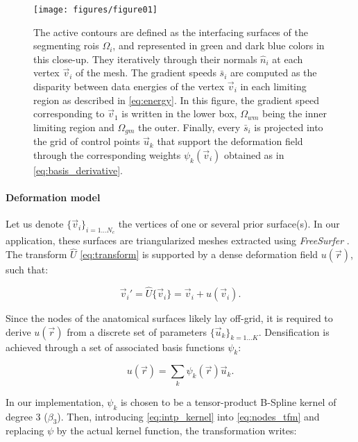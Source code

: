 \begin{figure}
	\texttt{[image: figures/figure01]}
	\caption{The active contours are defined as the interfacing surfaces of the segmenting
	\glspl{roi} $\Omega_i$, and represented in green and dark blue colors in this
	close-up.
	They iteratively through their normals $\hat{n}_i$ at each vertex $\vec{v}_i$ of the mesh.
	The gradient speeds $\bar{s}_i$ are computed as the disparity between data energies of
	the vertex $\vec{v}_i$ in each limiting region as described in \eqref{eq:energy}.
	In this figure, the gradient speed corresponding to $\vec{v}_1$ is written in the lower
	box, $\Omega_{wm}$ being the inner limiting region and $\Omega_{gm}$ the outer.
	Finally, every $\bar{s}_i$ is projected into the grid of control points $\vec{u}_k$ that
	support the deformation field through the corresponding weights $\psi_k(\vec{v}_i)$ obtained
	as in \eqref{eq:basis_derivative}.
	}\label{fig:method}
\end{figure}

\paragraph*{Deformation model}\label{sec:deformation_model}
Let us denote $\{\vec{v}_i\}_{i=1 \ldots N_c}$ the vertices of one or several prior
  surface(s).
In our application, these surfaces are triangularized meshes extracted using \emph{FreeSurfer}
  \citep{fischl_freesurfer_2012}.
The transform $\hat{U}$ \eqref{eq:transform} is supported by a dense deformation field
  $u(\vec{r})$, such that:

  \begin{equation}
  \vec{v}_i' = \hat{U}\{\vec{v}_i\} = \vec{v}_i + u(\vec{v}_i).
  \label{eq:nodes_tfm}
  \end{equation}

Since the nodes of the anatomical surfaces likely lay off-grid, it is required to
  derive $u(\vec{r})$ from a discrete set of parameters $\{\vec{u}_k\}_{k=1 \ldots K}$.
Densification is achieved through a set of associated basis functions $\psi_k$:

  \begin{equation}
  u(\vec{r}) = \sum_k \psi_k(\vec{r}) \vec{u}_k.
  \label{eq:intp_kernel}
  \end{equation}

In our implementation, $\psi_k$ is chosen to be a tensor-product B-Spline kernel
  of degree 3 ($\beta_3$).
Then, introducing \eqref{eq:intp_kernel} into \eqref{eq:nodes_tfm} and replacing
  $\psi$ by the actual kernel function, the transformation writes:

